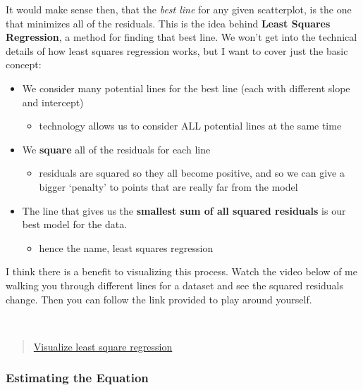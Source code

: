 \documentclass[]{article}
\providecommand{\tightlist}{%
  \setlength{\itemsep}{0pt}\setlength{\parskip}{0pt}}
\begin{document}
It would make sense then, that the \emph{best line} for any given
scatterplot, is the one that minimizes all of the residuals. This is the
idea behind \textbf{Least Squares Regression}, a method for finding that
best line. We won't get into the technical details of how least squares
regression works, but I want to cover just the basic concept:

\begin{itemize}
\item
  We consider many potential lines for the best line (each with
  different slope and intercept)

  \begin{itemize}
  \tightlist
  \item
    technology allows us to consider ALL potential lines at the same
    time
  \end{itemize}
\item
  We \textbf{square} all of the residuals for each line

  \begin{itemize}
  \tightlist
  \item
    residuals are squared so they all become positive, and so we can
    give a bigger `penalty' to points that are really far from the model
  \end{itemize}
\item
  The line that gives us the \textbf{smallest sum of all squared
  residuals} is our best model for the data.

  \begin{itemize}
  \tightlist
  \item
    hence the name, least squares regression
  \end{itemize}
\end{itemize}

I think there is a benefit to visualizing this process. Watch the video
below of me walking you through different lines for a dataset and see
the squared residuals change. Then you can follow the link provided to
play around yourself.

~

\begin{quote}
\href{https://dtkaplan.shinyapps.io/DA_least_squares/}{Visualize least
square regression}
\end{quote}

\hypertarget{estimating-the-equation}{%
\subsubsection{Estimating the Equation}\label{estimating-the-equation}}
\end{document}
